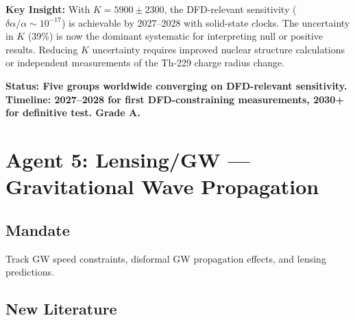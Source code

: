 \documentclass[11pt,a4paper]{article}
\begin{document}
\textbf{Key Insight:} With $K = 5900 \pm 2300$, the DFD-relevant sensitivity ($\delta\alpha/\alpha \sim 10^{-17}$) is achievable by 2027--2028 with solid-state clocks. The uncertainty in $K$ (39\%) is now the dominant systematic for interpreting null or positive results. Reducing $K$ uncertainty requires improved nuclear structure calculations or independent measurements of the Th-229 charge radius change.

\textbf{Status: Five groups worldwide converging on DFD-relevant sensitivity. Timeline: 2027--2028 for first DFD-constraining measurements, 2030+ for definitive test. Grade A.}

\section{Agent 5: Lensing/GW --- Gravitational Wave Propagation}

\subsection{Mandate}
Track GW speed constraints, disformal GW propagation effects, and lensing predictions.

\subsection{New Literature}
\end{document}
